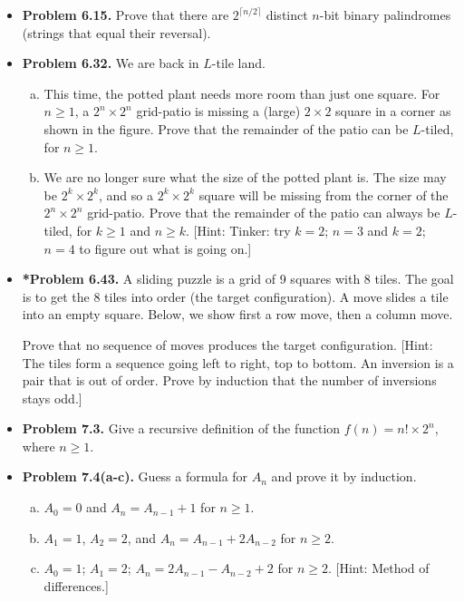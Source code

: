 \documentclass[11pt]{article}
\begin{document}
\begin{itemize}
\vspace{0.1in}

\item \textbf{Problem 6.15.}
  Prove that there are $2^{\lceil n/2\rceil}$ distinct $n$-bit binary palindromes
  (strings that equal their reversal).

\vspace{0.1in}

\item \textbf{Problem 6.32.}
  We are back in $L$-tile land.
  \begin{enumerate}[(a)]
  \item This time, the potted plant needs more room than just one square.
    For $n\ge 1$, a $2^n\times 2^n$ grid-patio is missing a (large) $2\times 2$ square
    in a corner as shown in the figure.
    Prove that the remainder of the patio can be $L$-tiled, for $n\ge 1$.
  \item We are no longer sure what the size of the potted plant is.
    The size may be $2^k\times 2^k$, and so a $2^k\times 2^k$ square
    will be missing from the corner of the $2^n\times 2^n$ grid-patio.
    Prove that the remainder of the patio can always be $L$-tiled,
    for $k\ge 1$ and $n\ge k$.
    [Hint: Tinker: try $k=2$; $n=3$ and $k=2$; $n=4$ to figure out what is going on.]
  \end{enumerate}

\newpage

\item \textbf{*Problem 6.43.}
  A sliding puzzle is a grid of 9 squares with 8 tiles.
  The goal is to get the 8 tiles into order (the target configuration).
  A move slides a tile into an empty square.
  Below, we show first a row move, then a column move.

  Prove that no sequence of moves produces the target configuration.
  [Hint: The tiles form a sequence going left to right, top to bottom.
  An inversion is a pair that is out of order.
  Prove by induction that the number of inversions stays odd.]

\vspace{0.1in}

\item \textbf{Problem 7.3.}
  Give a recursive definition of the function $f(n)=n!\times 2^n$, where $n\ge 1$.

\vspace{0.1in}

\item \textbf{Problem 7.4(a-c).}
  Guess a formula for $A_n$ and prove it by induction.
  \begin{enumerate}[(a)]
  \item $A_0=0$ and $A_n=A_{n-1}+1$ for $n\ge 1$.
  \item $A_1=1$, $A_2=2$, and $A_n=A_{n-1}+2A_{n-2}$ for $n\ge 2$.
  \item $A_0=1$; $A_1=2$; $A_n=2A_{n-1}-A_{n-2}+2$ for $n\ge 2$.
    [Hint: Method of differences.]
  \end{enumerate}

\end{itemize}
\end{document}
